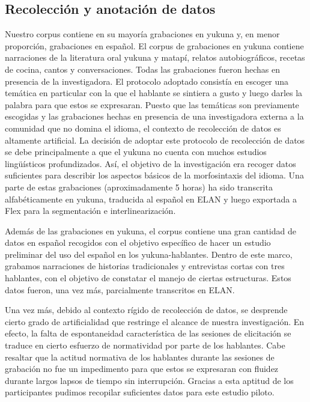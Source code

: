 \documentclass[output=paper]{langscibook}
\begin{document}
\subsection{Recolección y anotación de datos}

Nuestro corpus contiene en su mayoría grabaciones en yukuna y, en menor proporción, grabaciones en español. El corpus de grabaciones en yukuna contiene narraciones de la literatura oral yukuna y matapí, relatos autobiográficos, recetas de cocina, cantos y conversaciones. Todas las grabaciones fueron hechas en presencia de la investigadora. El protocolo adoptado consistía en escoger una temática en particular con la que el hablante se sintiera a gusto y luego darles la palabra para que estos se expresaran. Puesto que las temáticas son previamente escogidas y las grabaciones hechas en presencia de una investigadora externa a la comunidad que no domina el idioma, el contexto de recolección de datos es altamente artificial. La decisión de adoptar este protocolo de recolección de datos se debe principalmente a que el yukuna no cuenta con muchos estudios lingüísticos profundizados. Así, el objetivo de la investigación era recoger datos suficientes para describir los aspectos básicos de la morfosintaxis del idioma.  Una parte de estas grabaciones (aproximadamente 5 horas) ha sido transcrita alfabéticamente en yukuna, traducida al español en ELAN y luego exportada a Flex para la segmentación e interlinearización.

Además de las grabaciones en yukuna, el corpus contiene una gran cantidad de datos en español recogidos con el objetivo específico de hacer un estudio preliminar del uso del español en los yukuna-hablantes. Dentro de este marco, grabamos narraciones de historias tradicionales y entrevistas cortas con tres hablantes, con el objetivo de constatar el manejo de ciertas estructuras. Estos datos fueron, una vez más, parcialmente transcritos en ELAN. 

Una vez más, debido al contexto rígido de recolección de datos, se desprende cierto grado de artificialidad que restringe el alcance de nuestra investigación. En efecto, la falta de espontaneidad característica de las sesiones de elicitación se traduce en cierto esfuerzo de normatividad por parte de los hablantes. Cabe resaltar que la actitud normativa de los hablantes durante las sesiones de grabación no fue un impedimento para que estos se expresaran con fluidez durante largos lapsos de tiempo sin interrupción. Gracias a esta aptitud de los participantes pudimos recopilar suficientes datos para este estudio piloto.
\end{document}
